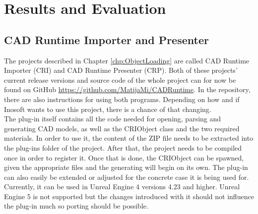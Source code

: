 \chapter{Results and Evaluation}\label{chp:Results}

\section{CAD Runtime Importer and Presenter}

The projects described in Chapter \ref{chp:ObjectLoading} are called CAD Runtime Importer (\acs{CRI}) and CAD Runtime Presenter (\acs{CRP}). Both of these projects' current release versions and source code of the whole project can for now be found on GitHub \url{https://github.com/MatijaMi/CADRuntime}. In the repository, there are also instructions for using both programs. Depending on how and if Inosoft wants to use this project, there is a chance of that changing.\\
The plug-in itself contains all the code needed for opening, parsing and generating CAD models, as well as the CRIObject class and the two required materials. In order to use it, the content of the ZIP file needs to be extracted into the plug-ins folder of the project. After that, the project needs to be compiled once in order to register it. Once that is done, the CRIObject can be spawned, given the appropriate files and the generating will begin on its own. The plug-in can also easily be extended or adjusted for the concrete case it is being used for. Currently, it can be used in Unreal Engine 4 versions 4.23 and higher. Unreal Engine 5 is not supported but the changes introduced with it should not influence the plug-in much so porting should be possible.\\
